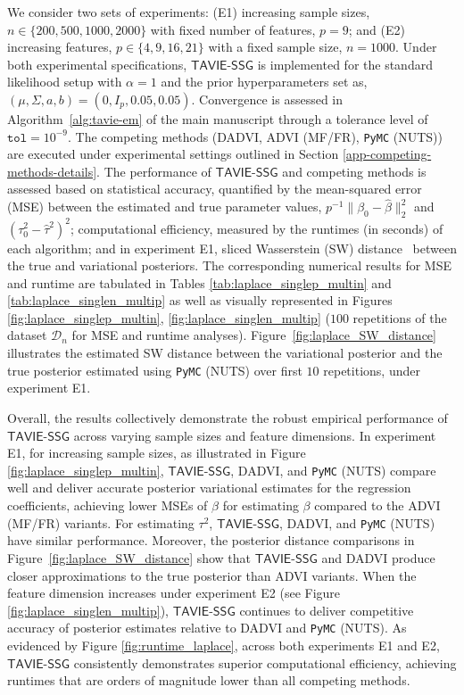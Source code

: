 \documentclass[12pt]{article}
\numberwithin{equation}{section}
\newcommand{\tssg}{\mathsf{TAVIE}\text{-}\mathsf{SSG}}
\begin{document}
We consider two sets of experiments: (E1) increasing sample sizes, $n\in \{200, 500, 1000, 2000\}$ with fixed number of features, $p=9$; and (E2) increasing features, $p\in \{4, 9, 16, 21\}$ with a fixed sample size, $n=1000$. Under both experimental specifications, $\tssg$ is implemented for the standard likelihood setup with $\alpha=1$ and the prior hyperparameters set as, $(\mu, \Sigma, a, b) = (0, I_p, 0.05, 0.05)$. Convergence is assessed in Algorithm~\ref{alg:tavie-em} of the main manuscript through a tolerance level of $\texttt{tol}=10^{-9}$. The competing methods (DADVI, ADVI (MF/FR), \texttt{PyMC} (NUTS)) are executed under experimental settings outlined in Section \ref{app-competing-methods-details}. The performance of $\mathsf{TAVIE}$-$\mathsf{SSG}$ and competing methods is assessed based on statistical accuracy, quantified by the {mean-squared error} (MSE) between the estimated and true parameter values, $p^{-1}\lVert \beta_0 - \widehat{\beta}\rVert_{2}^{2}$ and $(\tau_0^{2} - \widehat{\tau}^{2})^2$; computational efficiency, measured by the {runtimes} (in seconds) of each algorithm; and in experiment E1, sliced Wasserstein (SW) distance~\citep{bonneel2015sliced,kolouri2016sliced} between the true and variational posteriors. The corresponding numerical results for MSE and runtime are tabulated in Tables \ref{tab:laplace_singlep_multin} and \ref{tab:laplace_singlen_multip} as well as visually represented in Figures \ref{fig:laplace_singlep_multin}, \ref{fig:laplace_singlen_multip} ($100$ repetitions of the dataset $\mathcal{D}_n$ for MSE and runtime analyses). Figure~\ref{fig:laplace_SW_distance} illustrates the estimated SW distance between the variational posterior and the true posterior estimated using \texttt{PyMC} (NUTS) over first $10$ repetitions, under experiment E1.

Overall, the results collectively demonstrate the robust empirical performance of $\tssg$ across varying sample sizes and feature dimensions. In experiment E1, for increasing sample sizes, as illustrated in Figure \ref{fig:laplace_singlep_multin}, $\tssg$, DADVI, and \texttt{PyMC} (NUTS) compare well and deliver accurate posterior variational estimates for the regression coefficients, achieving lower MSEs of $\widehat{\beta}$ for estimating $\beta$ compared to the ADVI (MF/FR) variants.
For estimating $\tau^{2}$, $\tssg$, DADVI, and \texttt{PyMC} (NUTS) have similar performance.
Moreover, the posterior distance comparisons in Figure~\ref{fig:laplace_SW_distance} show that $\tssg$ and DADVI produce closer approximations to the true posterior than ADVI variants.
When the feature dimension increases under experiment E2 (see Figure \ref{fig:laplace_singlen_multip}), $\tssg$ continues to deliver competitive accuracy of posterior estimates relative to DADVI and \texttt{PyMC} (NUTS). As evidenced by Figure \ref{fig:runtime_laplace}, across both experiments E1 and E2, $\tssg$ consistently demonstrates superior computational efficiency, achieving runtimes that are orders of magnitude lower than all competing methods. 
\end{document}
